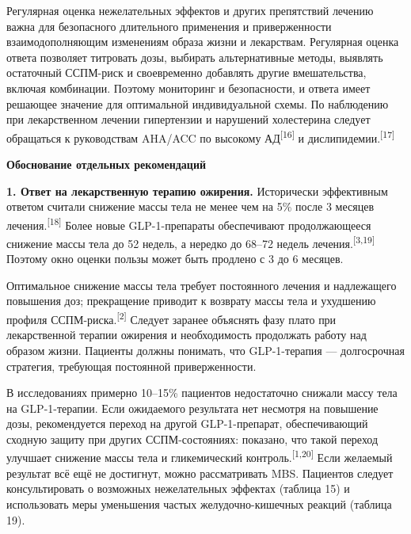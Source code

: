 \documentclass[11pt,a4paper]{article}
\newcommand{\src}[1]{\textsuperscript{[#1]}}
\newcommand{\heading}[1]{\par\medskip\textbf{#1}\par}
\begin{document}
Регулярная оценка нежелательных эффектов и других препятствий лечению важна для безопасного длительного применения и приверженности взаимодополняющим изменениям образа жизни и лекарствам. Регулярная оценка ответа позволяет титровать дозы, выбирать альтернативные методы, выявлять остаточный ССПМ-риск и своевременно добавлять другие вмешательства, включая комбинации. Поэтому мониторинг и безопасности, и ответа имеет решающее значение для оптимальной индивидуальной схемы. По наблюдению при лекарственном лечении гипертензии и нарушений холестерина следует обращаться к руководствам AHA/ACC по высокому АД\src{16} и дислипидемии.\src{17}

\heading{Обоснование отдельных рекомендаций}
\textbf{1. Ответ на лекарственную терапию ожирения.} Исторически эффективным ответом считали снижение массы тела не менее чем на 5\% после 3 месяцев лечения.\src{18} Более новые GLP-1-препараты обеспечивают продолжающееся снижение массы тела до 52 недель, а нередко до 68--72 недель лечения.\src{3,19} Поэтому окно оценки пользы может быть продлено с 3 до 6 месяцев.

Оптимальное снижение массы тела требует постоянного лечения и надлежащего повышения доз; прекращение приводит к возврату массы тела и ухудшению профиля ССПМ-риска.\src{2} Следует заранее объяснять фазу плато при лекарственной терапии ожирения и необходимость продолжать работу над образом жизни. Пациенты должны понимать, что GLP-1-терапия --- долгосрочная стратегия, требующая постоянной приверженности.

В исследованиях примерно 10--15\% пациентов недостаточно снижали массу тела на GLP-1-терапии. Если ожидаемого результата нет несмотря на повышение дозы, рекомендуется переход на другой GLP-1-препарат, обеспечивающий сходную защиту при других ССПМ-состояниях: показано, что такой переход улучшает снижение массы тела и гликемический контроль.\src{1,20} Если желаемый результат всё ещё не достигнут, можно рассматривать MBS. Пациентов следует консультировать о возможных нежелательных эффектах (таблица 15) и использовать меры уменьшения частых желудочно-кишечных реакций (таблица 19).
\end{document}

